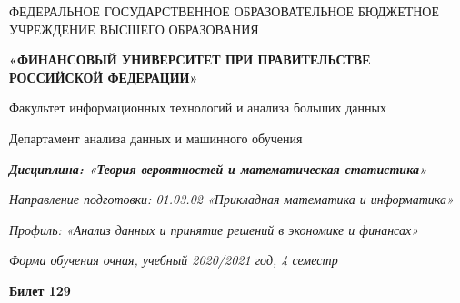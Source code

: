 \documentclass[a4paper,14pt]{article}
\begin{document}
\begin{center}
ФЕДЕРАЛЬНОЕ ГОСУДАРСТВЕННОЕ ОБРАЗОВАТЕЛЬНОЕ БЮДЖЕТНОЕ УЧРЕЖДЕНИЕ ВЫСШЕГО ОБРАЗОВАНИЯ

    \textbf{«ФИНАНСОВЫЙ УНИВЕРСИТЕТ ПРИ ПРАВИТЕЛЬСТВЕ РОССИЙСКОЙ ФЕДЕРАЦИИ»}

Факультет информационных технологий и анализа больших данных

Департамент анализа данных и машинного обучения

\textit{
	\textbf{Дисциплина: «Теория вероятностей и математическая статистика»}}

\textit{Направление подготовки: 01.03.02 «Прикладная математика и информатика»}

\textit{Профиль: «Анализ данных и принятие решений в экономике и финансах»}

\textit{Форма обучения очная, учебный 2020/2021 год, 4 семестр}

\textbf{Билет 129}

\end{center}
\end{document}
